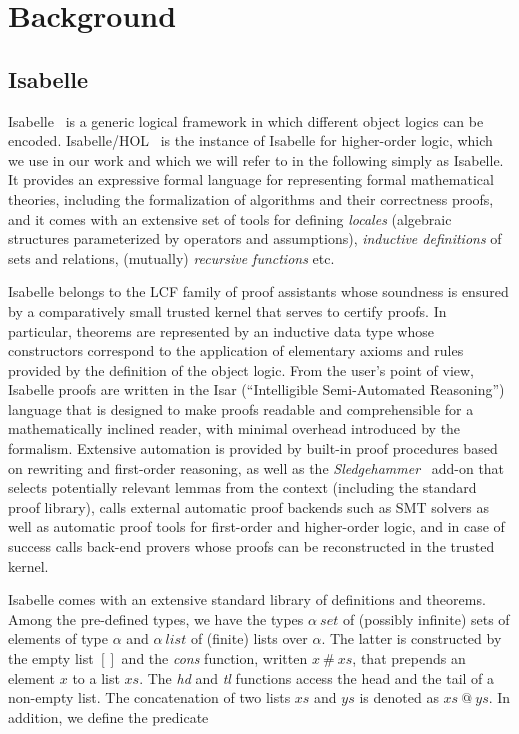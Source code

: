 \documentclass[sigplan,10pt,anonymous,review]{acmart}
\newcommand{\prog}[1]{\textit{#1}}
\begin{document}
\section{Background}
\label{sec:background}

\subsection{Isabelle}
\label{sec:isabelle}

Isabelle~\cite{paulson:isabelle} is a generic logical framework in which different object logics can be encoded. Isabelle/HOL~\cite{nipkow_isabellehol_2002} is the instance of Isabelle for higher-order logic, which we use in our work and which we will refer to in the following simply as Isabelle. It provides an expressive formal language for representing formal mathematical theories, including the formalization of algorithms and their correctness proofs, and it comes with an extensive set of tools for defining \emph{locales} (algebraic structures parameterized by operators and assumptions), \emph{inductive definitions} of sets and relations, (mutually) \emph{recursive functions} etc.

Isabelle belongs to the LCF family of proof assistants whose soundness is ensured by a comparatively small trusted kernel that serves to certify proofs. In particular, theorems are represented by an inductive data type whose constructors correspond to the application of elementary axioms and rules provided by the definition of the object logic. From the user's point of view, Isabelle proofs are written in the Isar (``Intelligible Semi-Automated Reasoning'') language that is designed to make proofs readable and comprehensible for a mathematically inclined reader, with minimal overhead introduced by the formalism. Extensive automation is provided by built-in proof procedures based on rewriting and first-order reasoning, as well as the \emph{Sledgehammer}~\cite{blanchette:sledgehammer} add-on that selects potentially relevant lemmas from the context (including the standard proof library), calls external automatic proof backends such as SMT solvers as well as automatic proof tools for first-order and higher-order logic, and in case of success calls back-end provers whose proofs can be reconstructed in the trusted kernel.

Isabelle comes with an extensive standard library of definitions and theorems. Among the pre-defined types, we have the types $\alpha~\prog{set}$ of (possibly infinite) sets of elements of type $\alpha$ and $\alpha~\prog{list}$ of (finite) lists over $\alpha$. The latter is constructed by the empty list $[]$ and the \emph{cons} function, written $x\ \#\  xs$, that prepends an element $x$ to a list $xs$. The \prog{hd} and \prog{tl} functions access the head and the tail of a non-empty list. The concatenation of two lists $xs$ and $ys$ is denoted as $xs\ @\ ys$. In addition, we define the predicate
\end{document}
